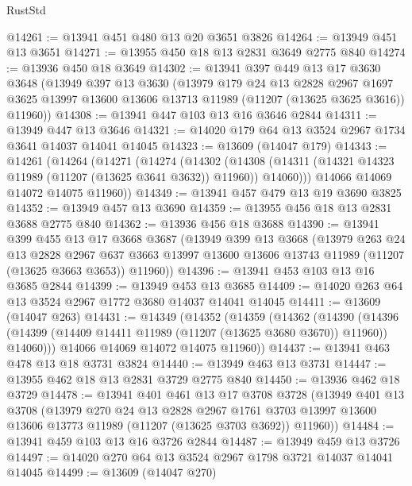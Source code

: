 \begin{lexlean}{RustStd}
\begin{coremodule}
@14261 := @13941 @451 @480 @13 @20 @3651 @3826
@14264 := @13949 @451 @13 @3651
@14271 := @13955 @450 @18 @13 @2831 @3649 @2775 @840
@14274 := @13936 @450 @18 @3649
@14302 := @13941
    @397
    @449
    @13
    @17
    @3630
    @3648
    (@13949
      @397
      @13
      @3630
      (@13979
        @179
        @24
        @13
        @2828
        @2967
        @1697
        @3625
        @13997
        @13600
        @13606
        @13713
        @11989
        (@11207 (@13625 @3625 @3616))
        @11960))
@14308 := @13941 @447 @103 @13 @16 @3646 @2844
@14311 := @13949 @447 @13 @3646
@14321 := @14020 @179 @64 @13 @3524 @2967 @1734 @3641 @14037 @14041 @14045
@14323 := @13609 (@14047 @179)
@14343 := @14261
    (@14264
      (@14271
        (@14274
          (@14302
            (@14308 (@14311 (@14321 @14323 @11989 (@11207 (@13625 @3641 @3632)) @11960)) @14060)))
        @14066
        @14069
        @14072
        @14075
        @11960))
@14349 := @13941 @457 @479 @13 @19 @3690 @3825
@14352 := @13949 @457 @13 @3690
@14359 := @13955 @456 @18 @13 @2831 @3688 @2775 @840
@14362 := @13936 @456 @18 @3688
@14390 := @13941
    @399
    @455
    @13
    @17
    @3668
    @3687
    (@13949
      @399
      @13
      @3668
      (@13979
        @263
        @24
        @13
        @2828
        @2967
        @637
        @3663
        @13997
        @13600
        @13606
        @13743
        @11989
        (@11207 (@13625 @3663 @3653))
        @11960))
@14396 := @13941 @453 @103 @13 @16 @3685 @2844
@14399 := @13949 @453 @13 @3685
@14409 := @14020 @263 @64 @13 @3524 @2967 @1772 @3680 @14037 @14041 @14045
@14411 := @13609 (@14047 @263)
@14431 := @14349
    (@14352
      (@14359
        (@14362
          (@14390
            (@14396 (@14399 (@14409 @14411 @11989 (@11207 (@13625 @3680 @3670)) @11960)) @14060)))
        @14066
        @14069
        @14072
        @14075
        @11960))
@14437 := @13941 @463 @478 @13 @18 @3731 @3824
@14440 := @13949 @463 @13 @3731
@14447 := @13955 @462 @18 @13 @2831 @3729 @2775 @840
@14450 := @13936 @462 @18 @3729
@14478 := @13941
    @401
    @461
    @13
    @17
    @3708
    @3728
    (@13949
      @401
      @13
      @3708
      (@13979
        @270
        @24
        @13
        @2828
        @2967
        @1761
        @3703
        @13997
        @13600
        @13606
        @13773
        @11989
        (@11207 (@13625 @3703 @3692))
        @11960))
@14484 := @13941 @459 @103 @13 @16 @3726 @2844
@14487 := @13949 @459 @13 @3726
@14497 := @14020 @270 @64 @13 @3524 @2967 @1798 @3721 @14037 @14041 @14045
@14499 := @13609 (@14047 @270)

\end{coremodule}
\end{lexlean}
